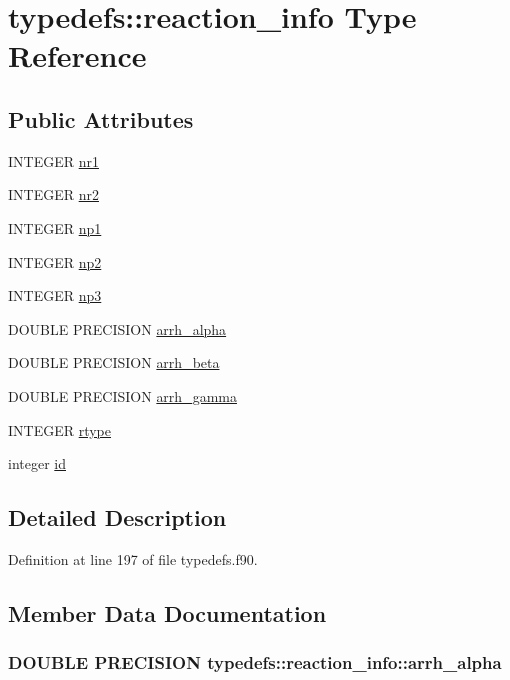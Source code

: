 \hypertarget{typetypedefs_1_1reaction__info}{
\section{typedefs::reaction\_\-info Type Reference}
\label{typetypedefs_1_1reaction__info}
}
\subsection*{Public Attributes}
\begin{DoxyCompactItemize}
\item 
INTEGER \hyperlink{typetypedefs_1_1reaction__info_a003f90458400f3d035bc43e7d7d20525}{nr1}
\item 
INTEGER \hyperlink{typetypedefs_1_1reaction__info_a48ab28601339c673e8ae61c8ab9386b2}{nr2}
\item 
INTEGER \hyperlink{typetypedefs_1_1reaction__info_a416d1c8efe1f3cf0bd338aa6aa405e16}{np1}
\item 
INTEGER \hyperlink{typetypedefs_1_1reaction__info_a33ba0f7158b887f3208dd1e8684e3b04}{np2}
\item 
INTEGER \hyperlink{typetypedefs_1_1reaction__info_a8963dd589f446e518865aebddeb04872}{np3}
\item 
DOUBLE PRECISION \hyperlink{typetypedefs_1_1reaction__info_a9baf1c2bbdf8f0d56fd93342d0a84873}{arrh\_\-alpha}
\item 
DOUBLE PRECISION \hyperlink{typetypedefs_1_1reaction__info_a4b7eb7e54ae72131312af6f924f7e373}{arrh\_\-beta}
\item 
DOUBLE PRECISION \hyperlink{typetypedefs_1_1reaction__info_ab603464ac8abe01ac6567ff26759aad7}{arrh\_\-gamma}
\item 
INTEGER \hyperlink{typetypedefs_1_1reaction__info_a3089ef7ea7760991f09190b030c6c1d1}{rtype}
\item 
integer \hyperlink{typetypedefs_1_1reaction__info_adf314158a153373fe50530ea4765d27b}{id}
\end{DoxyCompactItemize}


\subsection{Detailed Description}


Definition at line 197 of file typedefs.f90.

\subsection{Member Data Documentation}
\hypertarget{typetypedefs_1_1reaction__info_a9baf1c2bbdf8f0d56fd93342d0a84873}{
\subsubsection[{arrh\_\-alpha}]{\setlength{\rightskip}{0pt plus 5cm}DOUBLE PRECISION {\bf typedefs::reaction\_\-info::arrh\_\-alpha}}}
\label{typetypedefs_1_1reaction__info_a9baf1c2bbdf8f0d56fd93342d0a84873}



